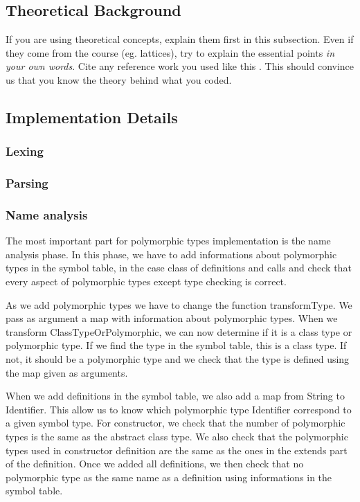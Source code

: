 \subsection{Theoretical Background}
If you are using theoretical concepts, explain them first in this subsection.
Even if they come from the course (eg. lattices), try to explain the essential
points \emph{in your own words}. Cite any reference work you used like this
\cite{TigerBook}. This should convince us that you know the theory behind what
you coded. 

\subsection{Implementation Details}
\subsubsection{Lexing}
\subsubsection{Parsing}
\subsubsection{Name analysis}
The most important part for polymorphic types implementation is the name analysis phase. In this phase, we have to add informations about polymorphic types in the symbol table, in the case class of definitions and calls and check that every aspect of polymorphic types except type checking is correct.

As we add polymorphic types we have to change the function transformType. We pass as argument a map with information about polymorphic types. When we transform ClassTypeOrPolymorphic, we can now determine if it is a class type or polymorphic type. If we find the type in the symbol table, this is a class type. If not, it should be a polymorphic type and we check that the type is defined using the map given as arguments.

When we add definitions in the symbol table, we also add a map from String to Identifier. This allow us to know which polymorphic type Identifier correspond to a given symbol type. For constructor, we check that the number of polymorphic types is the same as the abstract class type. We also check that the polymorphic types used in constructor definition are the same as the ones in the extends part of the definition. Once we added all definitions, we then check that no polymorphic type as the same name as a definition using informations in the symbol table.

